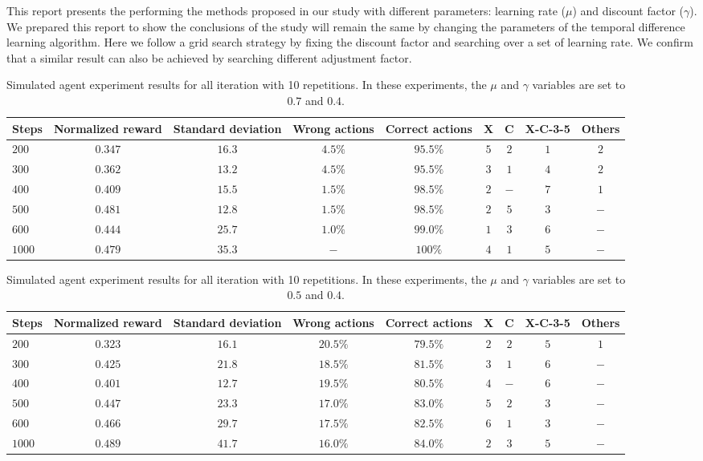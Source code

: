 \documentclass[11pt, a4paper]{article} %
\begin{document}
This report presents the performing the methods proposed in our study with different parameters: learning rate ($\mu$) and discount factor ($\gamma$). We prepared this report to show the conclusions of the study will remain the same by changing the parameters of the temporal difference learning algorithm. Here we follow a grid search strategy by fixing the discount factor and searching over a set of learning rate. We confirm that a similar result can also be achieved by searching different adjustment factor.

\begin{table*}[h]
\small\sf\centering 
\begin{tabular}{lcccccccc} 
\toprule
Steps & Normalized reward & Standard deviation & Wrong actions& Correct actions & X & C & X-C-3-5 & Others  \\
\midrule
$200$ & $0.347$ & $16.3$  &$4.5\%$  & $95.5\%$ & $5$  & $2$ & $1$ & $2$\\ 
$300$ & $0.362$ & $13.2$  &$4.5\%$  & $95.5\%$ & $3$  & $1$ & $4$ & $2$\\ 
$400$ & $0.409$ & $15.5$  &$1.5\%$  & $98.5\%$ & $2$  & $-$ & $7$ & $1$\\  
$500$ & $0.481$ & $12.8$  &$1.5\%$  & $98.5\%$ & $2$  & $5$ & $3$ & $-$\\ 
$600$ & $0.444$ & $25.7$  &$1.0\%$  & $99.0\%$ & $1$  & $3$ & $6$ & $-$\\ 
$1000$ & $0.479$ & $35.3$ &$-$  & $100\%$ & $4$  & $1$ & $5$ & $-$\\ \hline
\end{tabular} 
\caption{Simulated agent experiment results for all iteration with 10 repetitions. In these experiments, the $\mu$ and $\gamma$ variables are set to $0.7$ and $0.4$.}
\label{reward_cycle} 
\end{table*} 


\begin{table*}[h]
\small\sf\centering 
\begin{tabular}{lcccccccc} 
\toprule
Steps & Normalized reward & Standard deviation & Wrong actions& Correct actions&  X & C & X-C-3-5 & Others  \\
\midrule
$200$ & $0.323$ & $16.1$  &$20.5\%$  & $79.5\%$& $2$  & $2$ & $5$ & $1$\\ 
$300$ & $0.425$ & $21.8$  &$18.5\%$  & $81.5\%$& $3$  & $1$ & $6$ & $-$\\ 
$400$ & $0.401$ & $12.7$  &$19.5\%$  & $80.5\%$& $4$  & $-$ & $6$ & $-$\\  
$500$ & $0.447$ & $23.3$  &$17.0\%$  & $83.0\%$& $5$  & $2$ & $3$ & $-$\\ 
$600$ & $0.466$ & $29.7$  &$17.5\%$  & $82.5 \%$& $6$  & $1$ & $3$ & $-$\\ 
$1000$ & $0.489$ & $41.7$ &$16.0\%$  & $84.0\%$& $2$  & $3$ & $5$ & $-$\\ \hline
\end{tabular} 
\caption{Simulated agent experiment results for all iteration with 10 repetitions. In these experiments, the $\mu$ and $\gamma$ variables are set to $0.5$ and $0.4$.}
\label{reward_cycle} 
\end{table*} 
\end{document}
